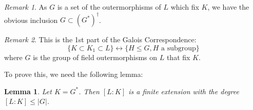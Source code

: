 \documentclass{article}
\theoremstyle{definition}
\theoremstyle{plain}%
\newtheorem{lem}[thm]{Lemma}
\theoremstyle{remark}
\newtheorem*{rem}{Remark}
\begin{document}
\begin{rem}
As $G$ is a set of the outermorphisms of $L$ which fix $K$, we have the obvious inclusion $G \subset (G^*)^{\dagger}$.
\end{rem}

\begin{rem}
This is the 1st part of the Galois Correspondence: \[\{K \subset K_1 \subset L\} \longleftrightarrow \{H \le G, H \text{ a subgroup}\}\] where $G$ is the group of field outermorphisms on $L$ that fix $K$.
\end{rem}

To prove this, we need the following lemma:

\begin{lem}\label{lemma Galois 1}
Let $K = G^*$. Then $[L : K]$ is a finite extension with the degree $[L : K] \le |G|$.
\end{lem}
\end{document}
